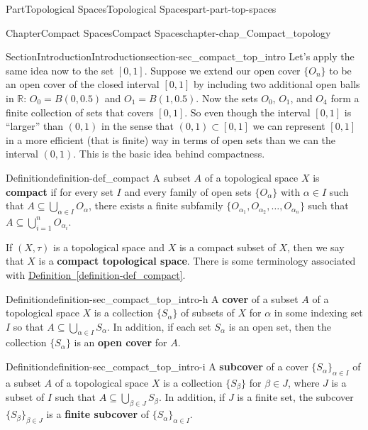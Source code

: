 \documentclass[oneside,10pt,]{book}
\newcommand{\xreffont}{\relax}
\newcommand{\terminology}[1]{\textbf{#1}}
\numberwithin{equation}{chapter}
\newcommand{\R}{\mathbb{R}}
\begin{document}
\begin{partptx}{Part}{Topological Spaces}{}{Topological Spaces}{}{}{part-part-top-spaces}
\begin{chapterptx}{Chapter}{Compact Spaces}{}{Compact Spaces}{}{}{chapter-chap_Compact_topology}
\begin{sectionptx}{Section}{Introduction}{}{Introduction}{}{}{section-sec_compact_top_intro}
Let's apply the same idea now to the set \([0, 1]\). Suppose we extend our open cover \(\{O_n\}\) to be an open cover of the closed interval \([0, 1]\) by including two additional open balls in \(\R\): \(O_0 = B(0, 0.5)\) and \(O_1 = B(1, 0.5)\). Now the sets \(O_0\), \(O_1\), and \(O_4\) form a finite collection of sets that covers \([0, 1]\). So even though the interval \([0, 1]\) is ``larger'' than \((0, 1)\) in the sense that \((0, 1) \subset [0, 1]\) we can represent \([0, 1]\) in a more efficient (that is finite) way in terms of open sets than we can the interval \((0, 1)\). This is the basic idea behind compactness.%
\begin{definition}{Definition}{}{definition-def_compact}%
%
A subset \(A\) of a topological space \(X\) is \terminology{compact} if for every set \(I\) and every family of open sets \(\{O_{\alpha}\}\) with \(\alpha \in I\) such that \(A \subseteq \bigcup_{\alpha \in I} O_{\alpha}\), there exists a finite subfamily \(\{O_{\alpha_1}, O_{\alpha_2}, \ldots, O_{\alpha_n}\}\) such that \(A \subseteq \bigcup_{i = 1}^n O_{\alpha_i}\).%
\end{definition}
If \((X,\tau)\) is a topological space and \(X\) is a compact subset of \(X\), then we say that \(X\) is a \terminology{compact topological space}. There is some terminology associated with \hyperref[definition-def_compact]{Definition~{\xreffont\ref{definition-def_compact}}}.%
\begin{definition}{Definition}{}{definition-sec_compact_top_intro-h}%
%
%
A \terminology{cover} of a subset \(A\) of a topological space \(X\) is a collection \(\{S_{\alpha}\}\) of subsets of \(X\) for \(\alpha\) in some indexing set \(I\) so that \(A \subseteq \bigcup_{\alpha \in I} S_{\alpha}\). In addition, if each set \(S_{\alpha}\) is an open set, then the collection \(\{S_{\alpha}\}\) is an \terminology{open cover} for \(A\).%
\end{definition}
\begin{definition}{Definition}{}{definition-sec_compact_top_intro-i}%
A \terminology{subcover} of a cover \(\{S_{\alpha}\}_{\alpha \in I}\) of a subset \(A\) of a topological space \(X\) is a collection \(\{S_{\beta}\}\) for \(\beta \in J\), where \(J\) is a subset of \(I\) such that \(A \subseteq \bigcup_{\beta \in J} S_{\beta}\). In addition, if \(J\) is a finite set, the subcover \(\{S_{\beta}\}_{\beta \in J}\) is a \terminology{finite subcover} of \(\{S_{\alpha}\}_{\alpha \in I}\).%
\end{definition}

\end{sectionptx}
\end{chapterptx}
\end{partptx}
\end{document}

